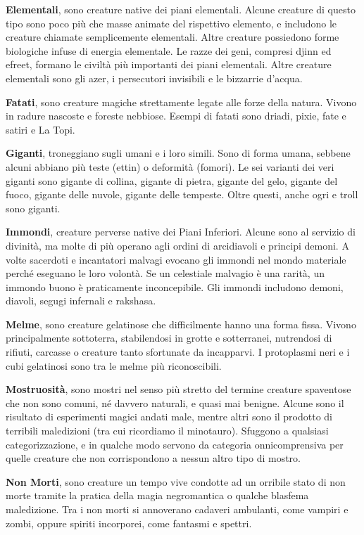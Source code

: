 \begin{multicols}{2}
\smallskip\textbf{Elementali}, sono creature native dei piani elementali. Alcune creature di questo tipo sono poco più che masse animate del rispettivo elemento, e includono le creature chiamate semplicemente elementali. Altre creature possiedono forme biologiche infuse di energia elementale. Le razze dei geni, compresi djinn ed efreet, formano le civiltà più importanti dei piani elementali. Altre creature elementali sono gli azer, i persecutori invisibili e le bizzarrie d'acqua.

\smallskip\textbf{Fatati}, sono creature magiche strettamente legate alle forze della natura. Vivono in radure nascoste e foreste nebbiose. Esempi di fatati sono driadi, pixie, fate e satiri e La Topi.

\smallskip\textbf{Giganti}, troneggiano sugli umani e i loro simili. Sono di forma umana, sebbene alcuni abbiano più teste (ettin) o deformità (fomori). Le sei varianti dei veri giganti sono gigante di collina, gigante di pietra, gigante del gelo, gigante del fuoco, gigante delle nuvole, gigante delle tempeste. Oltre questi, anche ogri e troll sono giganti.

\smallskip\textbf{Immondi}, creature perverse native dei Piani Inferiori. Alcune sono al servizio di divinità, ma molte di più operano agli ordini di arcidiavoli e principi demoni. A volte sacerdoti e incantatori malvagi evocano gli immondi nel mondo materiale perché eseguano le loro volontà. Se un celestiale malvagio è una rarità, un immondo buono è praticamente inconcepibile. Gli immondi includono demoni, diavoli, segugi infernali e rakshasa.

\smallskip\textbf{Melme}, sono creature gelatinose che difficilmente hanno una forma fissa. Vivono principalmente sottoterra, stabilendosi in grotte e sotterranei, nutrendosi di rifiuti, carcasse o creature tanto sfortunate da incapparvi. I protoplasmi neri e i cubi gelatinosi sono tra le melme più riconoscibili.

\smallskip\textbf{Mostruosità}, sono mostri nel senso più stretto del termine creature spaventose che non sono comuni, né davvero naturali, e quasi mai benigne. Alcune sono il risultato di esperimenti magici andati male, mentre altri sono il prodotto di terribili maledizioni (tra cui ricordiamo il minotauro). Sfuggono a qualsiasi categorizzazione, e in qualche modo servono da categoria onnicomprensiva per quelle creature che non corrispondono a nessun altro tipo di mostro.

\smallskip\textbf{Non Morti}, sono creature un tempo vive condotte ad un orribile stato di non morte tramite la pratica della magia negromantica o qualche blasfema maledizione. Tra i non morti si annoverano cadaveri ambulanti, come vampiri e zombi, oppure spiriti incorporei, come fantasmi e spettri.


\end{multicols}
